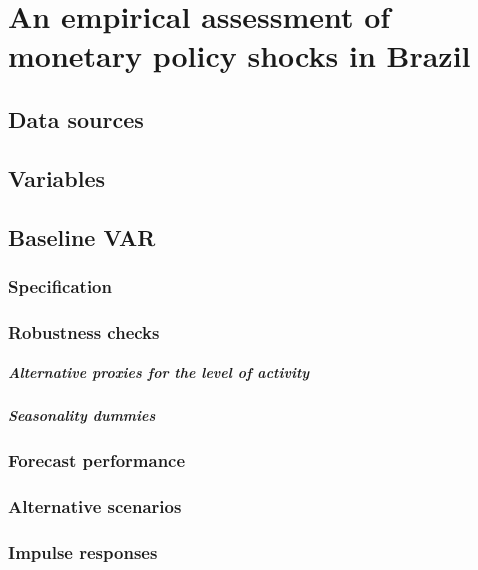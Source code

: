 

    
    \tableofcontents
    \chapter{An empirical assessment of monetary policy shocks in Brazil}
        \lipsum[1]
        \section{Data sources}
            \lipsum[1]
        \section{Variables}
            \lipsum[1]
        \section{Baseline VAR}
            \lipsum[1]
            \subsection{Specification}
                \lipsum[1]
            \subsection{Robustness checks}
                \paragraph{Alternative proxies for the level of activity}
                \paragraph{Seasonality dummies}
                \lipsum[1]
            \subsection{Forecast performance}
                \lipsum[1]
            \subsection{Alternative scenarios}
                \lipsum[1]
            \subsection{Impulse responses}
                \lipsum[1]
